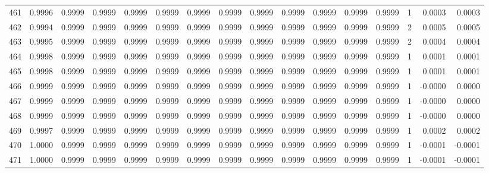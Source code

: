 \begin{tabular}{lrrrrrrrrrrrrrrr}
461 &      0.9996 &  0.9999 &  0.9999 &  0.9999 &  0.9999 &  0.9999 &  0.9999 &  0.9999 &  0.9999 &  0.9999 &   0.9999 &     0.9999 &      1 &                    0.0003 &                     0.0003 \\
462 &      0.9994 &  0.9999 &  0.9999 &  0.9999 &  0.9999 &  0.9999 &  0.9999 &  0.9999 &  0.9999 &  0.9999 &   0.9999 &     0.9999 &      2 &                    0.0005 &                     0.0005 \\
463 &      0.9995 &  0.9999 &  0.9999 &  0.9999 &  0.9999 &  0.9999 &  0.9999 &  0.9999 &  0.9999 &  0.9999 &   0.9999 &     0.9999 &      2 &                    0.0004 &                     0.0004 \\
464 &      0.9998 &  0.9999 &  0.9999 &  0.9999 &  0.9999 &  0.9999 &  0.9999 &  0.9999 &  0.9999 &  0.9999 &   0.9999 &     0.9999 &      1 &                    0.0001 &                     0.0001 \\
465 &      0.9998 &  0.9999 &  0.9999 &  0.9999 &  0.9999 &  0.9999 &  0.9999 &  0.9999 &  0.9999 &  0.9999 &   0.9999 &     0.9999 &      1 &                    0.0001 &                     0.0001 \\
466 &      0.9999 &  0.9999 &  0.9999 &  0.9999 &  0.9999 &  0.9999 &  0.9999 &  0.9999 &  0.9999 &  0.9999 &   0.9999 &     0.9999 &      1 &                   -0.0000 &                     0.0000 \\
467 &      0.9999 &  0.9999 &  0.9999 &  0.9999 &  0.9999 &  0.9999 &  0.9999 &  0.9999 &  0.9999 &  0.9999 &   0.9999 &     0.9999 &      1 &                   -0.0000 &                     0.0000 \\
468 &      0.9999 &  0.9999 &  0.9999 &  0.9999 &  0.9999 &  0.9999 &  0.9999 &  0.9999 &  0.9999 &  0.9999 &   0.9999 &     0.9999 &      1 &                   -0.0000 &                     0.0000 \\
469 &      0.9997 &  0.9999 &  0.9999 &  0.9999 &  0.9999 &  0.9999 &  0.9999 &  0.9999 &  0.9999 &  0.9999 &   0.9999 &     0.9999 &      1 &                    0.0002 &                     0.0002 \\
470 &      1.0000 &  0.9999 &  0.9999 &  0.9999 &  0.9999 &  0.9999 &  0.9999 &  0.9999 &  0.9999 &  0.9999 &   0.9999 &     0.9999 &      1 &                   -0.0001 &                    -0.0001 \\
471 &      1.0000 &  0.9999 &  0.9999 &  0.9999 &  0.9999 &  0.9999 &  0.9999 &  0.9999 &  0.9999 &  0.9999 &   0.9999 &     0.9999 &      1 &                   -0.0001 &                    -0.0001 \\

\end{tabular}
